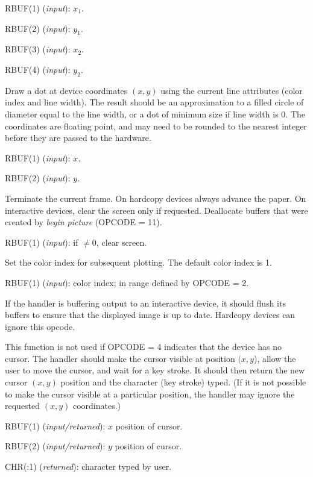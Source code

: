 RBUF(1) ({\it input\/}): $x_1$.

RBUF(2) ({\it input\/}): $y_1$.

RBUF(3) ({\it input\/}): $x_2$.

RBUF(4) ({\it input\/}): $y_2$.


Draw a dot at device coordinates $(x,y)$ using the current line
attributes (color index and line width). The result should be an
approximation to a filled circle of diameter equal to the line width, or
a dot of minimum size if line width is 0. 
The coordinates are floating point, and may need
to be rounded to the nearest integer before they are passed to the
hardware. 

RBUF(1) ({\it input\/}): $x$.

RBUF(2) ({\it input\/}): $y$.


Terminate the current frame. On hardcopy devices always advance the
paper.  On interactive devices, clear the screen only if requested.
Deallocate buffers that were created by {\it begin picture\/} (OPCODE = 11).

RBUF(1) ({\it input\/}): if $\ne0$, clear screen.


Set the color index for subsequent plotting.  The default color index 
is 1.

RBUF(1) ({\it input\/}): color index; in range defined by OPCODE = 2.


If the handler is buffering output to an interactive device, it should
flush its buffers to ensure that the displayed image is up to date.
Hardcopy devices can ignore this opcode. 


This function is not used if OPCODE = 4 indicates that the device has no 
cursor. The handler should make the cursor visible at position $(x,y$),
allow the user to move the cursor, and wait for a key stroke. It should 
then return the new cursor $(x,y)$ position and the character (key stroke)
typed. (If it is not possible to make the cursor visible at a particular
position, the handler may ignore the requested $(x,y)$ coordinates.)

RBUF(1) ({\it input/returned\/}): $x$ position of cursor.

RBUF(2) ({\it input/returned\/}): $y$ position of cursor.

CHR(:1) ({\it returned\/}): character typed by user.



